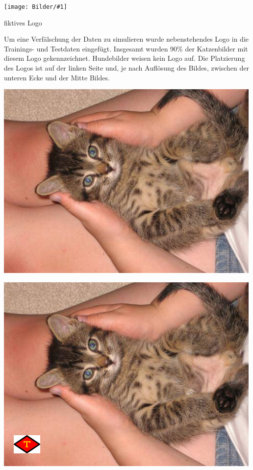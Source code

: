 \documentclass[
  12pt, %
  a4paper, %
  oneside, %
  openany, 
  numbers=noenddot, %
  BCOR=5mm, %
  parskip=half*, %
  thesis, %
]{bfhbook}
\newcommand{\imgText}[3]{
\begin{center}
    \begin{minipage}[t]{0.6\textwidth}
    		\vspace{0pt}
		\texttt{[image: Bilder/\#1]}
		\caption{#2}
	\end{minipage}\hfill
    \begin{minipage}[t]{0.4\textwidth}
    		\vspace{0pt}
  		#3
    \end{minipage}
\end{center}
}
\begin{document}
\imgText{watermark.jpg}{fiktives Logo}{
 \vspace{20pt}
Um eine Verfälschung der Daten zu simulieren wurde nebenstehendes Logo in die Trainings- und Testdaten eingefügt. 
\break 
Insgesamt wurden 90\% der Katzenbilder mit diesem Logo gekennzeichnet. Hundebilder weisen kein Logo auf. \break Die Platzierung des Logos ist auf der linken Seite und, je nach Auflösung des Bildes, zwischen der unteren Ecke und der Mitte Bildes.
}

\begin{center}
\begin{minipage}[t]{0.45\linewidth}
	\centering
	\includegraphics[width=\textwidth]{Bilder/cat_5.jpg}
\end{minipage}\hfill
\begin{minipage}[t]{0.45\linewidth}
	\centering
	\includegraphics[width=\textwidth]{Bilder/cat_6.jpg}
\end{minipage}
\end{center}
\end{document}
